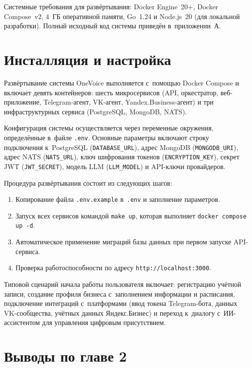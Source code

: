 Системные требования для развёртывания: Docker Engine~20+, Docker Compose~v2, 4~ГБ оперативной памяти, Go~1.24 и Node.js~20 (для локальной разработки). Полный исходный код системы приведён в~приложении~А.


\section{Инсталляция и настройка}
\label{sec:installation}

Развёртывание системы OneVoice выполняется с~помощью Docker Compose и включает девять контейнеров: шесть микросервисов (API, оркестратор, веб-приложение, Telegram-агент, VK-агент, Yandex.Business-агент) и три инфраструктурных сервиса (PostgreSQL, MongoDB, NATS).

Конфигурация системы осуществляется через переменные окружения, определённые в~файле \texttt{.env}. Основные параметры включают строку подключения к~PostgreSQL (\texttt{DATABASE\_URL}), адрес MongoDB (\texttt{MONGODB\_URI}), адрес NATS (\texttt{NATS\_URL}), ключ шифрования токенов (\texttt{ENCRYPTION\_KEY}), секрет JWT (\texttt{JWT\_SECRET}), модель LLM (\texttt{LLM\_MODEL}) и API-ключи провайдеров.

Процедура развёртывания состоит из следующих шагов:

\begin{enumerate}
  \item Копирование файла \texttt{.env.example} в~\texttt{.env} и заполнение параметров.
  \item Запуск всех сервисов командой \texttt{make up}, которая выполняет \texttt{docker compose up -d}.
  \item Автоматическое применение миграций базы данных при первом запуске API-сервиса.
  \item Проверка работоспособности по адресу \texttt{http://localhost:3000}.
\end{enumerate}

Типовой сценарий начала работы пользователя включает: регистрацию учётной записи, создание профиля бизнеса с~заполнением информации и расписания, подключение интеграций с~платформами (ввод токена Telegram-бота, данных VK-сообщества, учётных данных Яндекс.Бизнес) и переход к~диалогу с~ИИ-ассистентом для управления цифровым присутствием.


\section{Выводы по главе 2}
\label{sec:ch2-conclusions}

